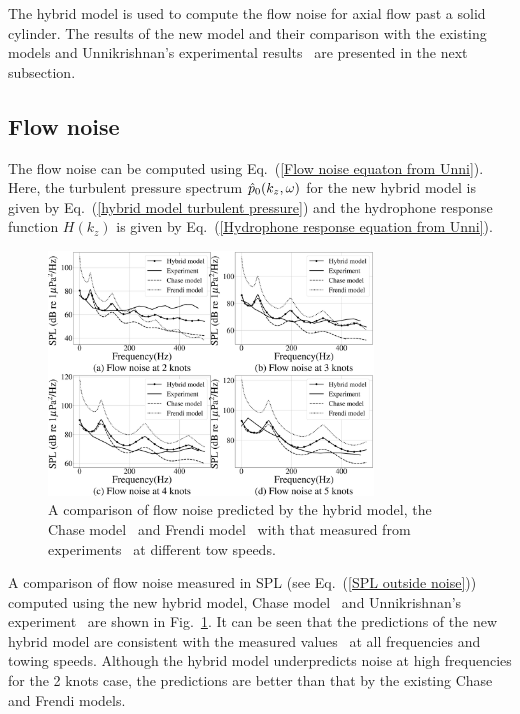 \documentclass[11pt,cleanfoot]{asme2ej}
\begin{document}
The hybrid model is used to compute the flow noise for axial flow past a solid cylinder. The results of the new model and their comparison with the existing models and Unnikrishnan's experimental results~\cite{Unni2011} are presented in the next subsection.

\subsection{Flow noise}
The flow noise can be computed using Eq.~(\ref{Flow noise equaton from Unni}). Here, the turbulent pressure spectrum $\Hat{p}_0(k_z,\omega)$ for the new hybrid model is given by Eq.~(\ref{hybrid model turbulent pressure}) and the hydrophone response function $H(k_z)$ is given by Eq.~(\ref{Hydrophone response equation from Unni}).
\begin{figure}[ht]
    \centering
    \includegraphics[width=3.4in]{Hybrid_model_Chase_frendi_vs_Unni_comparison.eps}
    \caption{A comparison of flow noise predicted by the hybrid model, the Chase model~\cite{Chase1981} and Frendi model~\cite{frendi2020} with that measured from experiments~\cite{Unni2011} at different tow speeds.}
\label{fig:Flow_noise_of_Hybrid_model_with_chase_frendi_and_Unnikrishnan}
\end{figure}
A comparison of flow noise measured in SPL (see Eq.~(\ref{SPL outside noise})) computed using the new hybrid model, Chase model~\cite{Chase1981} and Unnikrishnan's experiment~\cite{Unni2011} are shown in Fig.~\ref{fig:Flow_noise_of_Hybrid_model_with_chase_frendi_and_Unnikrishnan}. It can be seen that the predictions of the new hybrid model are consistent with the measured values~\cite{Unni2011} at all frequencies and towing speeds. Although the hybrid model underpredicts noise at high frequencies for the 2 knots case, the predictions are better than that by the existing Chase and Frendi models.
\end{document}
